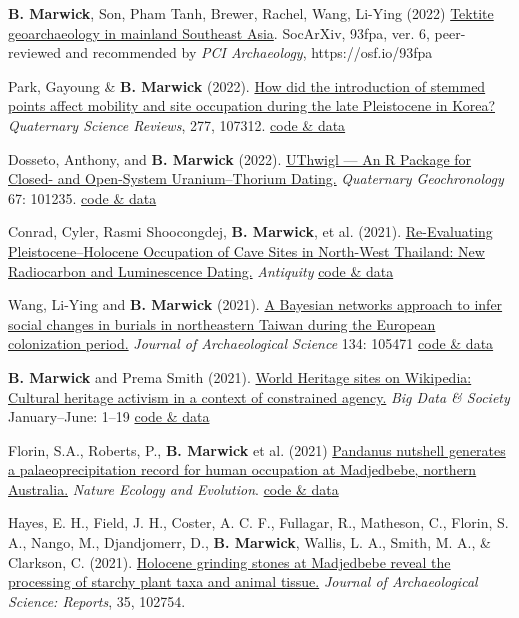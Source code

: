 \documentclass[11pt,article,oneside]{memoir}
\begin{document}
\ind \textbf{B. Marwick}, Son, Pham Tanh, Brewer, Rachel, Wang, Li-Ying (2022) \href{https://osf.io/93fpa}{Tektite geoarchaeology in mainland Southeast Asia}. SocArXiv, 93fpa, ver. 6, peer-reviewed and recommended by \textit{PCI Archaeology}, https://osf.io/93fpa 

\ind Park, Gayoung \& \textbf{B. Marwick} (2022). \href{https://doi.org/10.1016/j.quascirev.2021.107312}{How did the introduction of stemmed points affect mobility and site occupation during the late Pleistocene in Korea?} \textit{Quaternary Science Reviews}, 277, 107312. \href{https://github.com/parkgayoung/koreapaleolithicmobilityoccupation}{code \& data}

\ind Dosseto, Anthony, and \textbf{B. Marwick} (2022). \href{https://doi.org/10.1016/j.quageo.2021.101235}{UThwigl — An R Package for Closed- and Open-System Uranium–Thorium Dating.} \textit{Quaternary Geochronology} 67: 101235. \href{https://github.com/tonydoss/UThwigl}{code \& data}

\ind Conrad, Cyler, Rasmi Shoocongdej, \textbf{B. Marwick}, et al. (2021). \href{https://doi.org/10.15184/aqy.2021.44}{Re-Evaluating Pleistocene–Holocene Occupation of Cave Sites in North-West Thailand: New Radiocarbon and Luminescence Dating.} \textit{Antiquity} \href{https://doi.org/10.17605/OSF.IO/J3Z6F}{code \& data}

\ind Wang, Li-Ying and \textbf{B. Marwick} (2021). \href{https://doi.org/10.1016/j.jas.2021.105471}{A Bayesian networks approach to infer social changes in burials in northeastern Taiwan during the European colonization period.} \textit{Journal of Archaeological Science} 134: 105471 \href{http://doi.org/10.17605/OSF.IO/XGA6N}{code \& data}

\ind \textbf{B. Marwick} and Prema Smith (2021). \href{http://dx.doi.org/10.1177/20539517211017304}{World Heritage sites on Wikipedia: Cultural heritage activism in a context of constrained agency.} \textit{Big Data \& Society} January–June: 1–19 \href{http://doi.org/10.17605/OSF.IO/AY27G}{code \& data}

\ind Florin, S.A., Roberts, P., \textbf{B. Marwick} et al. (2021) \href{https://doi.org/10.1038/s41559-020-01379-8}{Pandanus nutshell generates a palaeoprecipitation record for human occupation at Madjedbebe, northern Australia.} \textit{Nature Ecology and Evolution}. \href{http://doi.org/10.17605/OSF.IO/9TN4F}{code \& data}

\ind Hayes, E. H., Field, J. H., Coster, A. C. F., Fullagar, R., Matheson, C., Florin, S. A., Nango, M., Djandjomerr, D., \textbf{B. Marwick}, Wallis, L. A., Smith, M. A., \& Clarkson, C. (2021). \href{https://doi.org/10.1016/j.jasrep.2020.102754}{Holocene grinding stones at Madjedbebe reveal the processing of starchy plant taxa and animal tissue.} \textit{Journal of Archaeological Science: Reports}, 35, 102754.
\end{document}
